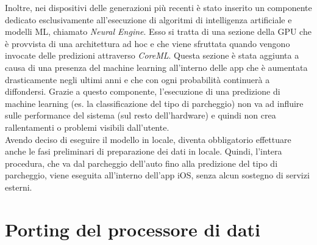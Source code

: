 Inoltre, nei dispositivi delle generazioni più recenti è stato inserito
un componente dedicato esclusivamente all'esecuzione di algoritmi di
intelligenza artificiale e modelli ML, chiamato \emph{Neural Engine}.
Esso si tratta di una sezione della GPU che è provvista di una 
architettura ad hoc e che viene sfruttata quando vengono invocate delle
predizioni attraverso \emph{CoreML}. Questa sezione è stata aggiunta 
a causa di una presenza del machine learning all'interno delle app
che è aumentata drasticamente negli ultimi anni e che con ogni
probabilità continuerà a diffondersi. Grazie a questo componente,
l'esecuzione di una predizione di machine learning (es. la 
classificazione del tipo di parcheggio) non va ad influire sulle
performance del sistema (sul resto dell'hardware) e quindi non 
crea rallentamenti o problemi visibili dall'utente.\\
Avendo deciso di eseguire il modello in locale, diventa obbligatorio
effettuare anche le fasi preliminari di preparazione dei dati in 
locale. Quindi, l'intera procedura, che va dal parcheggio 
dell'auto fino alla predizione del tipo di parcheggio, viene
eseguita all'interno dell'app iOS, senza alcun sostegno di 
servizi esterni.

\section{Porting del processore di dati}

